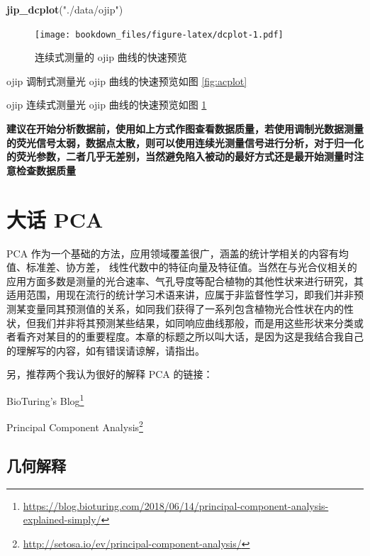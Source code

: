 \documentclass[
]{krantz}
\makeatletter
\newenvironment{Shaded}{\begin{snugshade}}{\end{snugshade}}
\newcommand{\KeywordTok}[1]{\textcolor[rgb]{0.13,0.29,0.53}{\textbf{#1}}}
\newcommand{\NormalTok}[1]{#1}
\newcommand{\StringTok}[1]{\textcolor[rgb]{0.31,0.60,0.02}{#1}}
\renewcommand{\href}[2]{#2\footnote{\url{#1}}}
\newenvironment{kframe}{%
\medskip{}
\setlength{\fboxsep}{.8em}
 \def\at@end@of@kframe{}%
 \ifinner\ifhmode%
  \def\at@end@of@kframe{\end{minipage}}%
  \begin{minipage}{\columnwidth}%
 \fi\fi%
 \def\FrameCommand##1{\hskip\@totalleftmargin \hskip-\fboxsep
 \colorbox{shadecolor}{##1}\hskip-\fboxsep
     \hskip-\linewidth \hskip-\@totalleftmargin \hskip\columnwidth}%
 \MakeFramed {\advance\hsize-\width
   \@totalleftmargin\z@ \linewidth\hsize
   \@setminipage}}%
 {\par\unskip\endMakeFramed%
 \at@end@of@kframe}
\renewenvironment{Shaded}{\begin{kframe}}{\end{kframe}}
\makeatother
\begin{document}
\begin{Shaded}
\begin{Highlighting}[]
\KeywordTok{jip_dcplot}\NormalTok{(}\StringTok{"./data/ojip"}\NormalTok{)}
\end{Highlighting}
\end{Shaded}

\begin{figure}
\centering
\texttt{[image: bookdown\_files/figure-latex/dcplot-1.pdf]}
\caption{\label{fig:dcplot}连续式测量的 ojip 曲线的快速预览}
\end{figure}

ojip 调制式测量光 ojip 曲线的快速预览如图 \ref{fig:acplot}

ojip 连续式测量光 ojip 曲线的快速预览如图 \ref{fig:dcplot}

\textbf{建议在开始分析数据前，使用如上方式作图查看数据质量，若使用调制光数据测量的荧光信号太弱，数据点太散，则可以使用连续光测量信号进行分析，对于归一化的荧光参数，二者几乎无差别，当然避免陷入被动的最好方式还是最开始测量时注意检查数据质量}

\cleardoublepage

\hypertarget{pca-anylysis}{%
\chapter{大话 PCA}\label{pca-anylysis}}

PCA 作为一个基础的方法，应用领域覆盖很广，涵盖的统计学相关的内容有均值、标准差、协方差， 线性代数中的特征向量及特征值。当然在与光合仪相关的应用方面多数是测量的光合速率、气孔导度等配合植物的其他性状来进行研究，其适用范围，用现在流行的统计学习术语来讲，应属于非监督性学习，即我们并非预测某变量同其预测值的关系，如同我们获得了一系列包含植物光合性状在内的性状，但我们并非将其预测某些结果，如同响应曲线那般，而是用这些形状来分类或者看齐对某目的的重要程度。本章的标题之所以叫大话，是因为这是我结合我自己的理解写的内容，如有错误请谅解，请指出。

另，推荐两个我认为很好的解释 PCA 的链接：

\href{https://blog.bioturing.com/2018/06/14/principal-component-analysis-explained-simply/}{BioTuring's Blog}

\href{http://setosa.io/ev/principal-component-analysis/}{Principal Component Analysis}

\hypertarget{geom-pca}{%
\section{几何解释}\label{geom-pca}}
\end{document}
